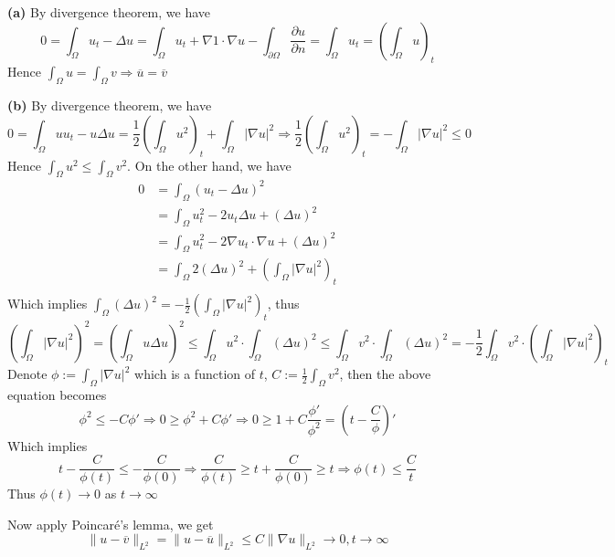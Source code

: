 \documentclass[main]{subfiles}
\begin{document}
\begin{solution}
\textbf{(a) }By divergence theorem, we have
\[0=\int_\Omega u_t-\Delta u=\int_\Omega u_t+\nabla1\cdot\nabla u-\int_{\partial\Omega}\frac{\partial u}{\partial n}=\int_\Omega u_t=\left(\int_\Omega u\right)_t\]
Hence $\displaystyle\int_\Omega u=\int_\Omega v\Rightarrow\overline u=\overline v$ \par
\textbf{(b) }By divergence theorem, we have
\[0=\int_\Omega uu_t-u\Delta u=\dfrac{1}{2}\left(\int_\Omega u^2\right)_t+\int_\Omega |\nabla u|^2\Rightarrow\dfrac{1}{2}\left(\int_\Omega u^2\right)_t=-\int_\Omega |\nabla u|^2\leq0\]
Hence $\displaystyle\int_\Omega u^2\leq\int_\Omega v^2$. On the other hand, we have
\begin{align*}
0&=\int_\Omega(u_t-\Delta u)^2 \\
&=\int_\Omega u_t^2-2u_t\Delta u+(\Delta u)^2 \\
&=\int_\Omega u_t^2-2\nabla u_t\cdot\nabla u+(\Delta u)^2 \\
&=\int_\Omega 2(\Delta u)^2+\left(\int_\Omega|\nabla u|^2\right)_t \\
\end{align*}
Which implies $\displaystyle\int_\Omega (\Delta u)^2=-\frac{1}{2}\left(\int_\Omega|\nabla u|^2\right)_t $, thus
\[\left(\int_\Omega|\nabla u|^2\right)^2=\left(\int_\Omega u\Delta u\right)^2\leq\int_\Omega u^2\cdot\int_\Omega (\Delta u)^2\leq\int_\Omega v^2\cdot\int_\Omega (\Delta u)^2=-\frac{1}{2}\int_\Omega v^2\cdot\left(\int_\Omega|\nabla u|^2\right)_t \]
Denote $\displaystyle\phi:=\int_\Omega|\nabla u|^2$ which is a function of $t$, $\displaystyle C:=\frac{1}{2}\int_\Omega v^2$, then the above equation becomes
\[\phi^2\leq -C\phi'\Rightarrow0\geq\phi^2 +C\phi'\Rightarrow0\geq1+C\frac{\phi'}{\phi^2}=\left(t-\frac{C}{\phi}\right)'\]
Which implies
\[t-\frac{C}{\phi(t)}\leq-\frac{C}{\phi(0)}\Rightarrow\frac{C}{\phi(t)}\geq t+\frac{C}{\phi(0)}\geq t\Rightarrow\phi(t)\leq\frac{C}{t}\]
Thus $\phi(t)\to0$ as $t\to\infty$ \par
Now apply Poincar\'e's lemma, we get
\[\|u-\overline v\|_{L^2}=\|u-\overline u\|_{L^2}\leq C\|\nabla u\|_{L^2}\to0,t\to\infty\]
\end{solution}
\end{document}
